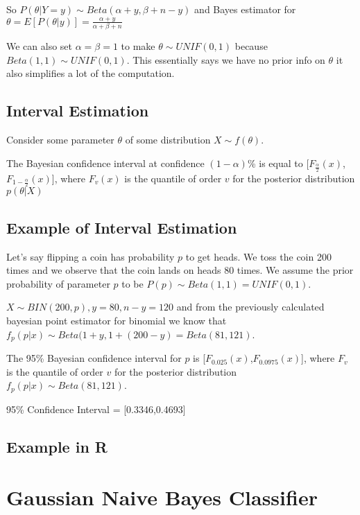 \documentclass{article}
\begin{document}
So $P(\theta|Y=y) \sim Beta(\alpha+y,\beta+n-y)$ and Bayes estimator for $\theta = E[P(\theta|y)] = \frac{\alpha+y}{\alpha+\beta+n}$\newline

We can also set $\alpha=\beta=1$ to make $\theta \sim UNIF(0,1)$ because $Beta(1,1) \sim UNIF(0,1)$. This essentially says we have no prior info on $\theta$ it also simplifies a lot of the computation.

\newpage

\subsection{Interval Estimation}
Consider some parameter $\theta$ of some distribution $X \sim f(\theta)$.\newline

The Bayesian confidence interval at confidence $(1-\alpha)$\% is equal to [$F_{\frac{\alpha}{2}}(x)$,$F_{1-\frac{\alpha}{2}}(x)$], where $F_{v}(x)$ is the quantile of order $v$ for the posterior distribution $p(\theta|X)$

\subsection{Example of Interval Estimation}

Let's say flipping a coin has probability $p$ to get heads. We toss the coin 200 times and we observe that the coin lands on heads 80 times. We assume the prior probability of parameter $p$ to be $P(p) \sim Beta(1,1) = UNIF(0,1)$.\newline

$X \sim BIN(200,p), y = 80, n-y = 120$ and from the previously calculated bayesian point estimator for binomial we know that $f_{p}(p|x) \sim Beta(1+y, 1+(200-y) = Beta(81,121)$.

The 95\% Bayesian confidence interval for $p$ is [$F_{0.025}(x)$,$F_{0.0975}(x)$], where $F_{v}$ is the quantile of order $v$ for the posterior distribution $f_{p}(p|x) \sim Beta(81,121)$.\newline

95\% Confidence Interval = [0.3346,0.4693]


\newpage

\subsection{Example in R}


\newpage
\section{Gaussian Naive Bayes Classifier}
\end{document}
